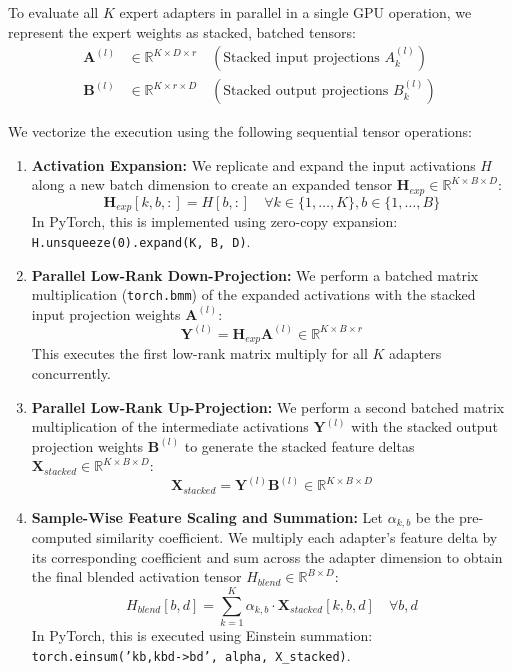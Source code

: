 \documentclass{article}
\theoremstyle{plain}
\theoremstyle{definition}
\theoremstyle{remark}
\begin{document}
To evaluate all $K$ expert adapters in parallel in a single GPU operation, we represent the expert weights as stacked, batched tensors:
\begin{align*}
  \mathbf{A}^{(l)} &\in \mathbb{R}^{K \times D \times r} \quad (\text{Stacked input projections } A_k^{(l)}) \\
  \mathbf{B}^{(l)} &\in \mathbb{R}^{K \times r \times D} \quad (\text{Stacked output projections } B_k^{(l)})
\end{align*}

We vectorize the execution using the following sequential tensor operations:
\begin{enumerate}
  \item \textbf{Activation Expansion:} We replicate and expand the input activations $H$ along a new batch dimension to create an expanded tensor $\mathbf{H}_{exp} \in \mathbb{R}^{K \times B \times D}$:
  \begin{equation}
    \mathbf{H}_{exp}[k, b, :] = H[b, :] \quad \forall k \in \{1, \dots, K\}, b \in \{1, \dots, B\}
  \end{equation}
  In PyTorch, this is implemented using zero-copy expansion: \texttt{H.unsqueeze(0).expand(K, B, D)}.
  
  \item \textbf{Parallel Low-Rank Down-Projection:} We perform a batched matrix multiplication (\texttt{torch.bmm}) of the expanded activations with the stacked input projection weights $\mathbf{A}^{(l)}$:
  \begin{equation}
    \mathbf{Y}^{(l)} = \mathbf{H}_{exp} \mathbf{A}^{(l)} \in \mathbb{R}^{K \times B \times r}
  \end{equation}
  This executes the first low-rank matrix multiply for all $K$ adapters concurrently.
  
  \item \textbf{Parallel Low-Rank Up-Projection:} We perform a second batched matrix multiplication of the intermediate activations $\mathbf{Y}^{(l)}$ with the stacked output projection weights $\mathbf{B}^{(l)}$ to generate the stacked feature deltas $\mathbf{X}_{stacked} \in \mathbb{R}^{K \times B \times D}$:
  \begin{equation}
    \mathbf{X}_{stacked} = \mathbf{Y}^{(l)} \mathbf{B}^{(l)} \in \mathbb{R}^{K \times B \times D}
  \end{equation}
  
  \item \textbf{Sample-Wise Feature Scaling and Summation:} Let $\alpha_{k, b}$ be the pre-computed similarity coefficient. We multiply each adapter's feature delta by its corresponding coefficient and sum across the adapter dimension to obtain the final blended activation tensor $H_{blend} \in \mathbb{R}^{B \times D}$:
  \begin{equation}
    H_{blend}[b, d] = \sum_{k=1}^K \alpha_{k, b} \cdot \mathbf{X}_{stacked}[k, b, d] \quad \forall b, d
  \end{equation}
  In PyTorch, this is executed using Einstein summation: \texttt{torch.einsum('kb,kbd->bd', alpha, X\_stacked)}.
\end{enumerate}
\end{document}

